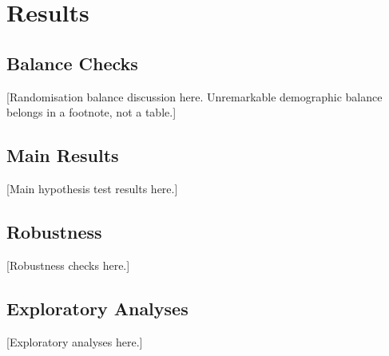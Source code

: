 \section{Results}

\subsection{Balance Checks}

[Randomisation balance discussion here. Unremarkable demographic balance belongs
in a footnote, not a table.]

% 

\subsection{Main Results}

[Main hypothesis test results here.]


\subsection{Robustness}

[Robustness checks here.]

\subsection{Exploratory Analyses}

[Exploratory analyses here.]
